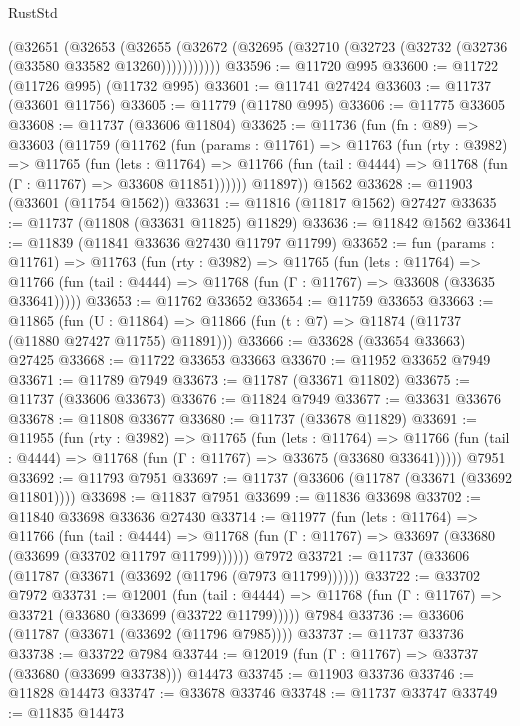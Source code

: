 \begin{lexlean}{RustStd}
\begin{coremodule}
      (@32651
        (@32653
          (@32655 (@32672 (@32695 (@32710 (@32723 (@32732 (@32736 (@33580 @33582 @13260)))))))))))
@33596 := @11720 @995
@33600 := @11722 (@11726 @995) (@11732 @995)
@33601 := @11741 @27424
@33603 := @11737 (@33601 @11756)
@33605 := @11779 (@11780 @995)
@33606 := @11775 @33605
@33608 := @11737 (@33606 @11804)
@33625 := @11736
    (fun (fn : @89) =>
    @33603
      (@11759
        (@11762
          (fun (params : @11761) =>
          @11763
            (fun (rty : @3982) =>
            @11765
              (fun (lets : @11764) =>
              @11766 (fun (tail : @4444) => @11768 (fun (Γ : @11767) => @33608 @11851))))))
        @11897))
    @1562
@33628 := @11903 (@33601 (@11754 @1562))
@33631 := @11816 (@11817 @1562) @27427
@33635 := @11737 (@11808 (@33631 @11825) @11829)
@33636 := @11842 @1562
@33641 := @11839 (@11841 @33636 @27430 @11797 @11799)
@33652 := fun (params : @11761) =>
  @11763
    (fun (rty : @3982) =>
    @11765
      (fun (lets : @11764) =>
      @11766 (fun (tail : @4444) => @11768 (fun (Γ : @11767) => @33608 (@33635 @33641)))))
@33653 := @11762 @33652
@33654 := @11759 @33653
@33663 := @11865
    (fun (U : @11864) => @11866 (fun (t : @7) => @11874 (@11737 (@11880 @27427 @11755) @11891)))
@33666 := @33628 (@33654 @33663) @27425
@33668 := @11722 @33653 @33663
@33670 := @11952 @33652 @7949
@33671 := @11789 @7949
@33673 := @11787 (@33671 @11802)
@33675 := @11737 (@33606 @33673)
@33676 := @11824 @7949
@33677 := @33631 @33676
@33678 := @11808 @33677
@33680 := @11737 (@33678 @11829)
@33691 := @11955
    (fun (rty : @3982) =>
    @11765
      (fun (lets : @11764) =>
      @11766 (fun (tail : @4444) => @11768 (fun (Γ : @11767) => @33675 (@33680 @33641)))))
    @7951
@33692 := @11793 @7951
@33697 := @11737 (@33606 (@11787 (@33671 (@33692 @11801))))
@33698 := @11837 @7951
@33699 := @11836 @33698
@33702 := @11840 @33698 @33636 @27430
@33714 := @11977
    (fun (lets : @11764) =>
    @11766
      (fun (tail : @4444) =>
      @11768 (fun (Γ : @11767) => @33697 (@33680 (@33699 (@33702 @11797 @11799))))))
    @7972
@33721 := @11737 (@33606 (@11787 (@33671 (@33692 (@11796 (@7973 @11799))))))
@33722 := @33702 @7972
@33731 := @12001
    (fun (tail : @4444) => @11768 (fun (Γ : @11767) => @33721 (@33680 (@33699 (@33722 @11799)))))
    @7984
@33736 := @33606 (@11787 (@33671 (@33692 (@11796 @7985))))
@33737 := @11737 @33736
@33738 := @33722 @7984
@33744 := @12019 (fun (Γ : @11767) => @33737 (@33680 (@33699 @33738))) @14473
@33745 := @11903 @33736
@33746 := @11828 @14473
@33747 := @33678 @33746
@33748 := @11737 @33747
@33749 := @11835 @14473

\end{coremodule}
\end{lexlean}
